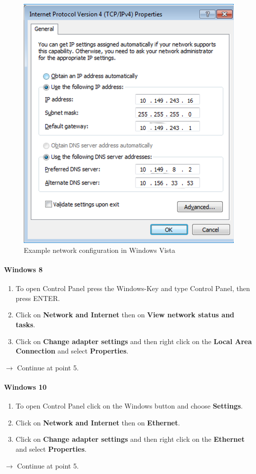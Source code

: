 \documentclass[a4paper,12pt]{scrartcl}
\newcommand{\optemph}[1]{\textbf{#1}}
\begin{document}
\begin{figure}[h!]
\begin{minipage}[c]{0.48\linewidth}
          \includegraphics[width=\linewidth,keepaspectratio]{Bilder/IP_Windows_EN}
          \caption{Example network configuration in Windows Vista}
        \end{minipage}
      \vspace{-15pt}
      \end{figure}
\paragraph*{Windows 8}
\begin{enumerate}	
	\item To open Control Panel press the Windows-Key and type Control Panel, then press ENTER.
    \item Click on \optemph{Network and Internet} then on \optemph{View network status and tasks}.
	\item Click on \optemph{Change adapter settings} and then right click on the \optemph{Local Area Connection} and select \optemph{Properties}.
\end{enumerate}
$\rightarrow$ Continue at point 5.
\paragraph*{Windows 10}
\begin{enumerate}	
	\item To open Control Panel click on the Windows button and choose \optemph{Settings}.
    \item Click on \optemph{Network and Internet} then on \optemph{Ethernet}.
	\item Click on \optemph{Change adapter settings} and then right click on the \optemph{Ethernet} and select \optemph{Properties}.
\end{enumerate}
$\rightarrow$ Continue at point 5.
\end{document}
